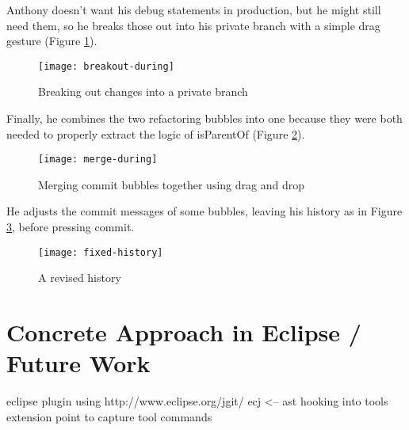 \documentclass[conference]{IEEEtran}
\begin{document}
Anthony doesn't want his debug statements in production, but he might still need them,
 so he breaks those out into his private branch with a simple drag gesture (Figure \ref{fig:private-branch}).
\begin{figure}[h]
\centering
\texttt{[image: breakout-during]}
\caption{Breaking out changes into a private branch}
\label{fig:private-branch}
\end{figure}

Finally, he combines the two refactoring bubbles into one because they were both needed to properly extract
the logic of isParentOf (Figure \ref{fig:merge}).
\begin{figure}[h]
\centering
\texttt{[image: merge-during]}
\caption{Merging commit bubbles together using drag and drop}
\label{fig:merge}
\end{figure}
He adjusts the commit messages of some bubbles, leaving his history as in Figure \ref{fig:fixed-history}, before pressing commit.

\begin{figure}[h]
\centering
\texttt{[image: fixed-history]}
\caption{A revised history}
\label{fig:fixed-history}
\end{figure}

\section{Concrete Approach in Eclipse / Future Work}

eclipse plugin using http://www.eclipse.org/jgit/
ecj <-- ast
hooking into tools extension point to capture tool commands



\end{document}
